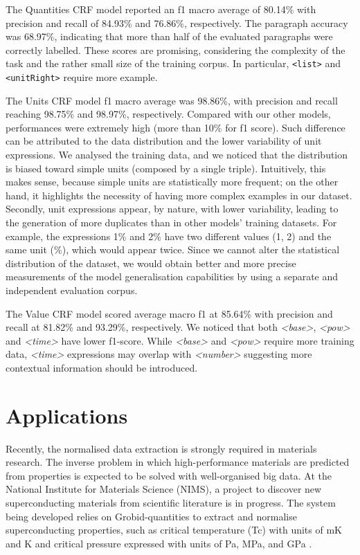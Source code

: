 \documentclass[sigconf]{acmart}
\begin{document}
The Quantities CRF model reported an f1 macro average of 80.14\% with precision and recall of 84.93\% and 76.86\%, respectively. The paragraph accuracy was 68.97\%, indicating that more than half of the evaluated paragraphs were correctly labelled. These scores are promising, considering the complexity of the task and the rather small size of the training corpus. In particular, \texttt{<list>} and \texttt{<unitRight>} require more example. 

The Units CRF model f1 macro average was 98.86\%, with precision and recall reaching 98.75\% and 98.97\%, respectively. Compared with our other models, performances were extremely high (more than 10\% for f1 score). 
Such difference can be attributed to the data distribution and the lower variability of unit expressions. We analysed the training data, and we noticed that the distribution is biased toward simple units (composed by a single triple). Intuitively, this makes sense, because simple units are statistically more frequent; on the other hand, it highlights the necessity of having more complex examples in our dataset. 
Secondly, unit expressions appear, by nature, with lower variability, leading to the generation of more duplicates than in other models' training datasets. For example, the expressions 1\% and 2\% have two different values (1, 2) and the same unit (\%), which would appear twice. 
Since we cannot alter the statistical distribution of the dataset, we would obtain better and more precise measurements of the model generalisation capabilities by using a separate and independent evaluation corpus. 

The Value CRF model scored average macro f1 at 85.64\% with precision and recall at 81.82\% and 93.29\%, respectively.
We noticed that both \textit{<base>}, \textit{<pow>} and \textit{<time>} have lower f1-score. While \textit{<base>} and \textit{<pow>} require more training data, \textit{<time>} expressions may overlap with \textit{<number>} suggesting more contextual information should be introduced. 


\section{Applications}
\label{sec:use_cases}
Recently, the normalised data extraction is strongly required in materials research. The inverse problem in which high-performance materials are predicted from properties is expected to be solved with well-organised big data. At the National Institute for Materials Science (NIMS), a project to discover new superconducting materials from scientific literature is in progress. The system being developed relies on Grobid-quantities to extract and normalise superconducting properties, such as critical temperature (Tc) with units of mK and K and critical pressure expressed with units of Pa, MPa, and GPa \cite{foppiano2019proposal}. 
\end{document}
